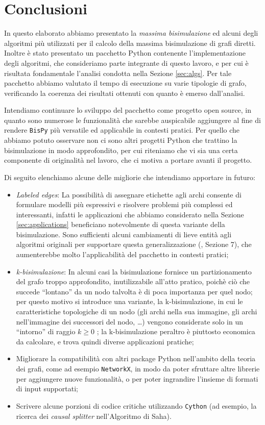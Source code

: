 \section*{Conclusioni}
\label{sec:conclusions}

In questo elaborato abbiamo presentato la \emph{massima bisimulazione} ed alcuni degli algoritmi più utilizzati per il calcolo della massima bisimulazione di grafi diretti. Inoltre è stato presentato un pacchetto Python contenente l'implementazione degli algoritmi, che consideriamo parte integrante di questo lavoro, e per cui è risultata fondamentale l'analisi condotta nella Sezione \ref{sec:algs}. Per tale pacchetto abbiamo valutato il tempo di esecuzione su varie tipologie di grafo, verificando la coerenza dei risultati ottenuti con quanto è emerso dall'analisi.

Intendiamo continuare lo sviluppo del pacchetto come progetto open source, in quanto sono numerose le funzionalità che sarebbe auspicabile aggiungere al fine di rendere \texttt{BisPy} più versatile ed applicabile in contesti pratici. Per quello che abbiamo potuto osservare non ci sono altri progetti Python che trattino la bisimulazione in modo approfondito, per cui riteniamo che vi sia una certa componente di originalità nel lavoro, che ci motiva a portare avanti il progetto.

Di seguito elenchiamo alcune delle migliorie che intendiamo apportare in futuro:
\begin{itemize}
    \item \emph{Labeled edges}: La possibilità di assegnare etichette agli archi consente di formulare modelli più espressivi e risolvere problemi più complessi ed interessanti, infatti le applicazioni che abbiamo considerato nella Sezione \ref{sec:applications} beneficiano notevolmente di questa variante della bisimulazione. Sono sufficienti alcuni cambiamenti di lieve entità agli algoritmi originali per supportare questa generalizzazione (\cite{dovier}, Sezione 7), che aumenterebbe molto l'applicabilità del pacchetto in contesti pratici;
    \item \emph{k-bisimulazione}: In alcuni casi la bisimulazione fornisce un partizionamento del grafo troppo approfondito, inutilizzabile all'atto pratico, poichè ciò che succede ``lontano'' da un nodo talvolta è di poca importanza per quel nodo; per questo motivo si introduce una variante, la k-bisimulazione, in cui le caratteristiche topologiche di un nodo (gli archi nella sua immagine, gli archi nell'immagine dei successori del nodo, \dots) vengono considerate solo in un ``intorno'' di raggio $k \geq 0$ \cite{kbisi}; la k-bisimulazione peraltro è piuttosto economica da calcolare, e trova quindi diverse applicazioni pratiche;
    \item Migliorare la compatibilità con altri package Python nell'ambito della teoria dei grafi, come ad esempio \texttt{NetworkX}, in modo da poter sfruttare altre librerie per aggiungere nuove funzionalità, o per poter ingrandire l'insieme di formati di input supportati;
    \item Scrivere alcune porzioni di codice critiche utilizzando \texttt{Cython} (ad esempio, la ricerca dei \emph{causal splitter} nell'Algoritmo di Saha).
\end{itemize}
